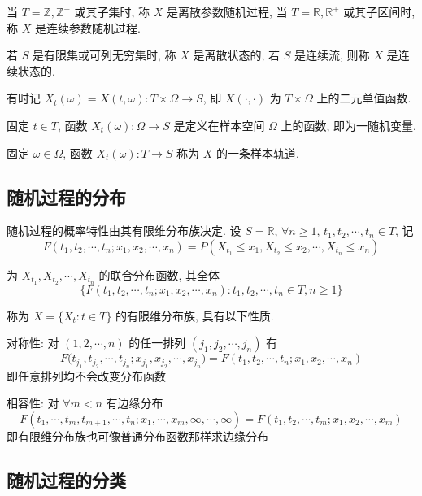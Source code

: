 \documentclass[openany]{ctexbook}
\theoremstyle{kaiti}
\theoremstyle{normal}
\begin{document}
当 $T=\mathbb{Z},\mathbb{Z}^+$ 或其子集时, 称 $X$ 是离散参数随机过程, 当 $T=\mathbb{R},\mathbb{R}^+$ 或其子区间时, 称 $X$ 是连续参数随机过程. 

若 $S$ 是有限集或可列无穷集时, 称 $X$ 是离散状态的, 若 $S$ 是连续流, 则称 $X$ 是连续状态的.

有时记 $X_t(\omega)=X(t,\omega):T\times\Omega\to S$, 即 $X(\cdot,\cdot)$ 为 $T\times\Omega$ 上的二元单值函数. 

固定 $t\in T$, 函数 $X_t(\omega):\Omega\to S$ 是定义在样本空间 $\Omega$ 上的函数, 即为一随机变量.

固定 $\omega\in\Omega$, 函数 $X_t(\omega):T\to S$ 称为 $X$ 的一条样本轨道. 

\subsection{随机过程的分布}

随机过程的概率特性由其有限维分布族决定. 设 $S=\mathbb{R}$, $\forall n\geqslant1$, $t_1,t_2,\cdots,t_n\in T$, 记
\begin{equation}
  F(t_1,t_2,\cdots,t_n;x_1,x_2,\cdots,x_n)=P(X_{t_1}\leqslant x_1,X_{t_2}\leqslant x_2,\cdots,X_{t_n}\leqslant x_n)
\end{equation}

为 $X_{t_1},X_{t_2},\cdots,X_{t_n}$ 的联合分布函数, 其全体
\begin{equation}
  \{F(t_1,t_2,\cdots,t_n;x_1,x_2,\cdots,x_n):t_1,t_2,\cdots,t_n\in T,n\geqslant1\}
\end{equation}

称为 $X=\{X_t:t\in T\}$ 的有限维分布族, 具有以下性质.

对称性: 对 $(1,2,\cdots,n)$ 的任一排列 $(j_1,j_2,\cdots,j_n)$ 有
\begin{equation}
  F\Big(t_{j_1},t_{j_2},\cdots,t_{j_n};x_{j_1},x_{j_2},\cdots,x_{j_n}\Big)=F(t_1,t_2,\cdots,t_n;x_1,x_2,\cdots,x_n)
\end{equation} 即任意排列均不会改变分布函数

相容性: 对 $\forall m<n$ 有边缘分布
\begin{equation}
  F(t_1,\cdots,t_m,t_{m+1},\cdots,t_n;x_1,\cdots,x_m,\infty,\cdots,\infty)=F(t_1,t_2,\cdots,t_m;x_1,x_2,\cdots,x_m)
\end{equation} 即有限维分布族也可像普通分布函数那样求边缘分布

\subsection{随机过程的分类}
\end{document}
